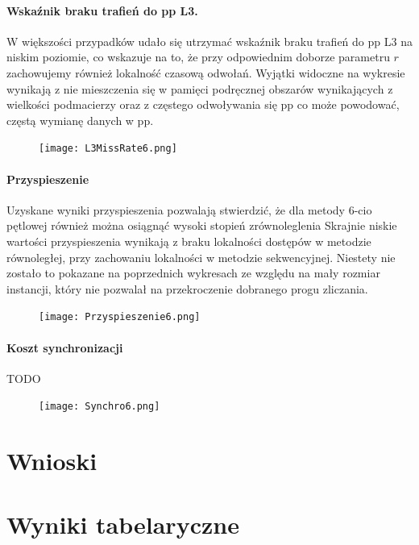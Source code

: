 \documentclass{scrartcl}
\begin{document}
\paragraph{Wskaźnik braku trafień do pp L3.} W większości przypadków udało się utrzymać wskaźnik braku trafień do pp L3 na niskim poziomie, co wskazuje na to, że przy odpowiednim doborze parametru $r$ zachowujemy również lokalność czasową odwołań. Wyjątki widoczne na wykresie wynikają z nie mieszczenia się w pamięci podręcznej obszarów wynikających z wielkości podmacierzy oraz z częstego odwoływania się pp co może powodować, częstą wymianę danych w pp.
\begin{figure}[H]
\texttt{[image: L3MissRate6.png]}
\end{figure}

\paragraph{Przyspieszenie} Uzyskane wyniki przyspieszenia pozwalają stwierdzić, że dla metody 6-cio pętlowej również można osiągnąć wysoki stopień zrównoleglenia Skrajnie niskie wartości przyspieszenia wynikają z braku lokalności dostępów w metodzie równoległej, przy zachowaniu lokalności w metodzie sekwencyjnej. Niestety nie zostało to pokazane na poprzednich wykresach ze względu na mały rozmiar instancji, który nie pozwalał na przekroczenie dobranego progu zliczania.
\begin{figure}[H]
\texttt{[image: Przyspieszenie6.png]}
\end{figure}

\paragraph{Koszt synchronizacji} TODO
\begin{figure}[H]
\texttt{[image: Synchro6.png]}
\end{figure}

\section{Wnioski}
\section{Wyniki tabelaryczne}
\end{document}
